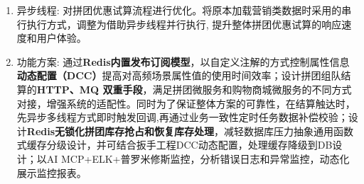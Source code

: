 \documentclass{resume}
\begin{document}
\begin{itemize}[parsep=0ex]
{\begin{enumerate}[leftmargin = 0.3em, topsep=2pt, itemsep=0pt, parsep=0pt]
  \item 异步线程: 对拼团优惠试算流程进行优化。将原本加载营销类数据时采用的串行执行方式，调整为借助异步线程并行执行, 提升整体拼团优惠试算的响应速度和用户体验。
  \vspace{0.07cm}
  \item 功能方案: 通过\textbf{Redis内置发布订阅模型}，以自定义注解的方式控制属性信息\textbf{动态配置（DCC）}提高对高频场景属性值的使用时间效率；设计拼团组队结算的\textbf{HTTP、MQ 双重手段}，满足拼团微服务和购物商城微服务的不同方式对接，增强系统的适配性。同时为了保证整体方案的可靠性，在结算触达时，先异步多线程方式即时触发回调,再通过业务一致性定时任务数据补偿校验；设计\textbf{Redis无锁化拼团库存抢占和恢复库存处理}，减轻数据库压力抽象通用函数式缓存分级设计，并可结合扳手工程DCC动态配置，处理缓存降级到DB设计；以AI MCP+ELK+普罗米修斯监控，分析错误日志和异常监控，动态化展示监控报表。
\end{enumerate}
}
\end{itemize}
\end{document}
